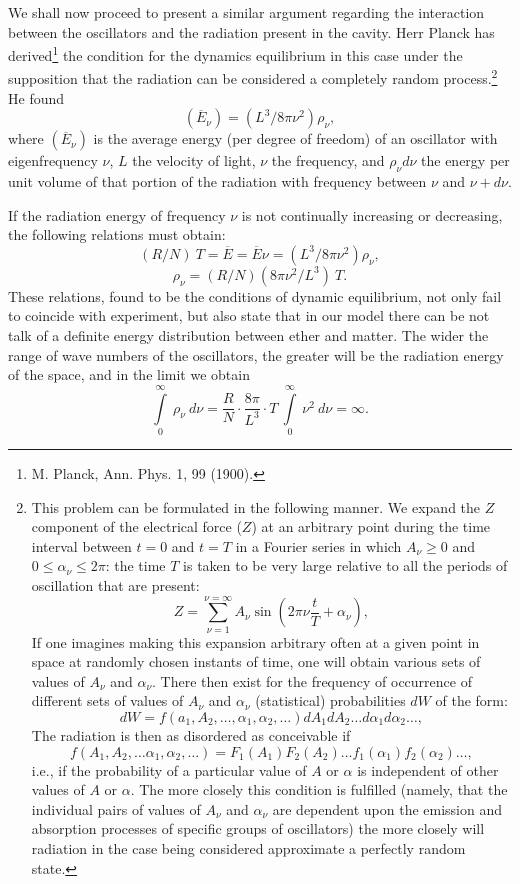 \documentclass[12pt]{article}
\begin{document}
We shall now proceed to present a similar argument regarding the interaction
between the oscillators and the radiation present in the cavity. Herr Planck has
derived\footnote{M. Planck, Ann. Phys. 1, 99 (1900).} the condition for the
dynamics equilibrium in this case under the supposition that the radiation can
be considered a completely random process.\footnote{This problem can be
formulated in the following manner. We expand the $Z$ component of the
electrical force ($Z$) at an arbitrary point during the time interval between $t
= 0$ and $t = T$ in a Fourier series in which $A_{\nu} \geq 0$ and $0 
\leq \alpha_{\nu} \leq 2 \pi$: the time $T$ is taken to be very large relative
to all the periods of oscillation that are present:
$$
Z = \sum^{\nu = \infty}_{\nu = 1} A_{\nu} \sin \left( 2 \pi \nu \frac{t}{T}
+ \alpha_{\nu} \right),
$$
If one imagines making this expansion arbitrary often at a given point in space
at randomly chosen instants of time, one will obtain various sets of values of $
A_{\nu}$ and $\alpha_{\nu}$. There then exist for the frequency of occurrence of
different sets of values of $A_{\nu}$ and $\alpha_{\nu}$ (statistical)
probabilities $dW$ of the form:
$$
dW = f (a_1, A_2, \ldots, \alpha_1, \alpha_2, \ldots) dA_1 dA_2 \ldots d\alpha_1
d \alpha_2 \ldots,
$$
The radiation is then as disordered as conceivable if
$$
f (A_1, A_2, \ldots \alpha_1, \alpha_2, \ldots) = F_1 (A_1) F_2 (A_2) \ldots f_1
(\alpha_1) f_2 (\alpha_2) \ldots,
$$
i.e., if the probability of a particular value of $A$ or $\alpha$
is independent of other values of $A$ or $\alpha$.
The more
closely this condition is fulfilled (namely, that the individual pairs of values
of $A_{\nu}$ and $\alpha_{\nu}$ are dependent upon the emission and absorption
processes of specific groups of oscillators) the more closely will radiation in
the case being considered approximate a perfectly random state.} He found 
$$
(\overline{E}_{\nu}) = (L^3/ 8 \pi \nu^2) \rho_{\nu},
$$
where $(\overline{E}_{\nu})$ is the average energy (per degree of freedom) of an
oscillator with eigenfrequency $\nu$, $L$ the velocity of light, $\nu$ the
frequency, and $\rho_{\nu} d \nu$ the energy per unit volume of that portion of
the radiation with frequency between $\nu$ and $\nu + d\nu$.

If the radiation energy of frequency $\nu$ is 
not continually increasing or
decreasing, the following relations must obtain:
$$
(R/N)~ T = \overline{E} = \overline{E}{\nu} = (L^3/8 \pi \nu^2) 
\rho_{\nu},
$$
$$
\rho_{\nu} = (R/N) (8\pi \nu^2/L^3) ~ T.
$$
These relations, found to be the conditions of dynamic equilibrium, not only
fail to coincide with experiment, but also state that in our model there can be
not talk of a definite energy distribution between ether and matter. The wider
the range of wave numbers  of the oscillators, the greater will be the radiation
energy of the space, and in the limit we obtain
$$
\int \limits^{\infty}_0~ \rho_{\nu}~ d \nu = \frac{R}{N} \cdot \frac{8 \pi}{L^3}
\cdot T~ \int \limits^{\infty}_0 ~ \nu^2 ~d \nu = \infty.
$$
\end{document}
